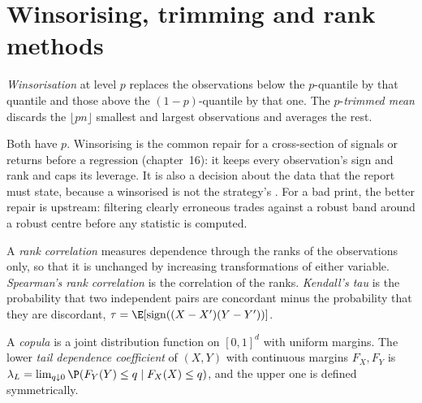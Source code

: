 \section{Winsorising, trimming and rank methods}

\begin{definition}\label{def:qm:robust-statistics-and-heavy-tails:winsor}
\emph{Winsorisation} at level $p$ replaces the observations below the $p$-quantile by that quantile and those above the
$(1 - p)$-quantile by that one. The $p$-\emph{trimmed mean} discards the $\lfloor pn\rfloor$ smallest and largest
observations and averages the rest.
\end{definition}

Both have  $p$. Winsorising is the common repair for a cross-section of signals or returns before a regression
(chapter~16): it keeps every observation's sign and rank and caps its leverage. It is also a decision about the data that the report must
state, because a winsorised  is not the strategy's . For a bad print, the better repair is upstream: filtering
clearly erroneous trades against a robust band around a robust centre before any statistic is computed.

\begin{definition}\label{def:qm:robust-statistics-and-heavy-tails:rank}
A \emph{rank correlation} measures dependence through the ranks of the observations only, so that it is unchanged
by increasing transformations of either variable. \emph{Spearman's rank correlation} is the correlation
of the ranks. \emph{Kendall's tau} is the probability that two independent pairs are concordant minus the
probability that they are discordant, $\tau = \E[\operatorname{sign}((X - X')(Y - Y'))]$.
\end{definition}

\begin{definition}\label{def:qm:robust-statistics-and-heavy-tails:copula}
A \emph{copula} is a joint distribution function on $[0, 1]^d$ with uniform margins. The lower \emph{tail dependence
coefficient} of $(X, Y)$ with continuous margins $F_X, F_Y$ is $\lambda_L = \lim_{q \downarrow
0}\P(F_Y(Y) \le q \mid F_X(X) \le q)$, and the upper one is defined symmetrically.
\end{definition}

